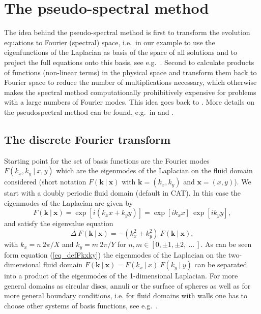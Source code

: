%
\chapter{The pseudo-spectral method} 
\label{chap_pseudspec}
%
The idea behind the pseudo-spectral method is first to transform
the evolution equations to Fourier (spectral) space, i.e.\ in our
example to use the eigenfunctions of the Laplacian as basis of the
space of all solutions and to project the full equations onto this basis,
see e.g.\ \cite{canutoetal1988}. Second to calculate products of functions
(non-linear terms) in the physical space and transform them back
to Fourier space to reduce the number of multiplications necessary,
which otherwise makes the spectral method computationally prohibitively
expensive for problems with a large numbers of Fourier modes. This idea
goes back to \cite{kreissandoliger1972}. More details on the
pseudospectral method can be found, e.g.\ in \cite{orszag1972}
and \cite{fornberg1987}.
%
\section{The discrete Fourier transform}
\label{sec_discretefourier}
%
Starting point for the set of basis functions are the Fourier modes 
$F(k_{x},k_{y} \ | \ x,y)$ which are the eigenmodes of the Laplacian 
on the fluid domain considered (short notation 
$F(\mathbf{k} \ | \ \mathbf{x})$ with 
$\mathbf{k} = (k_{x},k_{y})$ and $\mathbf{x} = (x,y)$).  
We start with a doubly periodic fluid domain (default in CAT). 
In this case the eigenmodes of the Laplacian are given by
\begin{equation} \label{eq_defFkxky}
  F(\mathbf{k} \ | \ \mathbf{x}) 
   = 
 \exp \left[ i  \left(k_{x} x + k_{y} y \right) \right]
   = 
 \exp \left[ i k_{x} x \right] \ 
 \exp \left[ i k_{y} y \right],
\end{equation}
and satisfy the eigenvalue equation
\begin{equation} \label{eq_eigFkxky}
 \Delta \ F(\mathbf{k} \ | \ \mathbf{x})
   =
  - \left( k_{x}^{2} + k_{y}^{2} \right) \ 
    F(\mathbf{k} \ | \ \mathbf{x}),
\end{equation}
with $k_{x} = n \ 2 \pi/X$ and $k_{y} = m \ 2 \pi/Y$ for 
$n,m \in [0,\pm 1, \pm 2,\ \dots \ ]$. As can be seen form equation 
(\ref{eq_defFkxky}) the eigenmodes of the Laplacian on the 
two-dimensional fluid domain 
$F(\mathbf{k} \ | \ \mathbf{x}) = F(k_{x} \ | \ x) \ F(k_{y} \ | \ y)$
can be separated into a product of the eigenmodes of the 
1-dimensional Laplacian. For more general domains
as circular discs, annuli or the surface of spheres as well as 
for more general boundary conditions, i.e. for fluid domains with walls 
one has to choose other systems of basis functions, 
see e.g.\ \cite{canutoetal1988}.

